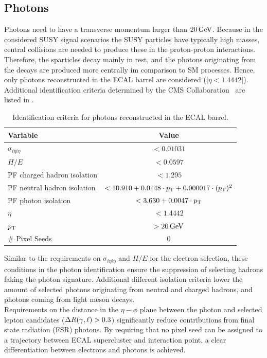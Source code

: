 \subsection{Photons}
Photons need to have a transverse momentum larger than $20\,\text{Ge\hspace{-.08em}V}$.  Because in the considered SUSY signal scenarios the SUSY particles have typically high masses, central collisions are needed to produce these in the proton-proton interactions.  Therefore, the sparticles decay mainly in rest, and the photons originating from the decays are produced more centrally im comparison to SM processes. Hence, only photons reconstructed in the ECAL barrel are considered ($|\eta<1.4442|$). Additional identification criteria determined by the CMS Collaboration~\cite{photonID} are listed in .
\begin{table}[h!]
 \centering
 \caption{Identification criteria for photons reconstructed in the ECAL barrel.}
 \label{tab:photonID}
 \begin{tabular}{lc}
  Variable                    & Value                                                \\\hline
  $\sigma_{i\eta i\eta}$      & $<0.01031$                                           \\
  $H/E$                       & $<0.0597$                                            \\
  PF charged hadron isolation & $<1.295$                                             \\
  PF neutral hadron isolation & $<10.910 + 0.0148 \cdot p_{\mathrm{T}} + 0.000017\cdot (p_{\mathrm{T}})^2$ \\
  PF photon isolation         & $<3.630+0.0047\cdot p_{\mathrm{T}}$                             \\\hline
  $\eta$                      & $<1.4442$                                            \\
  $p_{\mathrm{T}}$                       & $>20\,\text{Ge\hspace{-.08em}V}$                                            \\
  \# Pixel Seeds              & 0                                                    \\\hline
 \end{tabular}
\end{table}
Similar to the requirements on $\sigma_{i\eta i\eta}$ and $H/E$ for the electron selection, these conditions in the photon identification ensure the suppression of selecting hadrons faking the photon signature. Additional different isolation criteria lower the amount of selected photons originating from neutral and charged hadrons, and photons coming from light meson decays.\\
Requirements on the distance in the $\eta-\phi$ plane between the photon and selected lepton candidates ($\Delta R(\gamma,\ell)>0.3$) significantly reduce contributions from final state radiation (FSR) photons. By requiring that no pixel seed can be assigned to a trajectory between ECAL supercluster and interaction point, a clear differentiation between electrons and photons is achieved.

